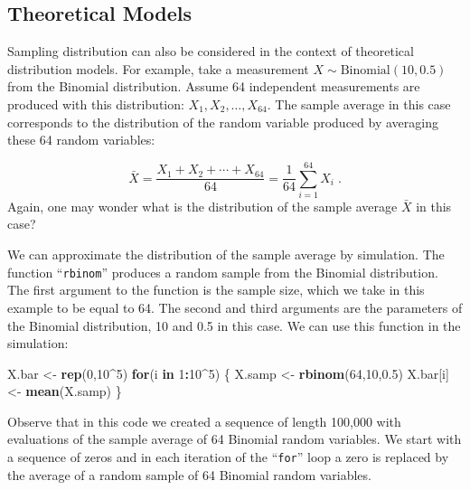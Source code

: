 \documentclass[]{krantz}
\makeatletter
\newenvironment{Shaded}{\begin{snugshade}}{\end{snugshade}}
\newcommand{\ControlFlowTok}[1]{\textcolor[rgb]{0.13,0.29,0.53}{\textbf{#1}}}
\newcommand{\DecValTok}[1]{\textcolor[rgb]{0.00,0.00,0.81}{#1}}
\newcommand{\FloatTok}[1]{\textcolor[rgb]{0.00,0.00,0.81}{#1}}
\newcommand{\KeywordTok}[1]{\textcolor[rgb]{0.13,0.29,0.53}{\textbf{#1}}}
\newcommand{\NormalTok}[1]{#1}
\newcommand{\OperatorTok}[1]{\textcolor[rgb]{0.81,0.36,0.00}{\textbf{#1}}}
\newcommand{\StringTok}[1]{\textcolor[rgb]{0.31,0.60,0.02}{#1}}
\newenvironment{kframe}{%
\medskip{}
\setlength{\fboxsep}{.8em}
 \def\at@end@of@kframe{}%
 \ifinner\ifhmode%
  \def\at@end@of@kframe{\end{minipage}}%
  \begin{minipage}{\columnwidth}%
 \fi\fi%
 \def\FrameCommand##1{\hskip\@totalleftmargin \hskip-\fboxsep
 \colorbox{shadecolor}{##1}\hskip-\fboxsep
     \hskip-\linewidth \hskip-\@totalleftmargin \hskip\columnwidth}%
 \MakeFramed {\advance\hsize-\width
   \@totalleftmargin\z@ \linewidth\hsize
   \@setminipage}}%
 {\par\unskip\endMakeFramed%
 \at@end@of@kframe}
\renewenvironment{Shaded}{\begin{kframe}}{\end{kframe}}
\theoremstyle{definition}
\theoremstyle{definition}
\theoremstyle{definition}
\theoremstyle{remark}
\makeatother
\begin{document}
\hypertarget{subsec:theoreticalmdls}{%
\subsection{Theoretical Models}\label{subsec:theoreticalmdls}}

Sampling distribution can also be considered in the context of
theoretical distribution models. For example, take a measurement
\(X \sim \mathrm{Binomial}(10,0.5)\) from the Binomial distribution.
Assume 64 independent measurements are produced with this distribution:
\(X_1, X_2, \ldots, X_{64}\). The sample average in this case corresponds
to the distribution of the random variable produced by averaging these
64 random variables:

\[\bar X = \frac{X_1 + X_2 + \cdots + X_{64}} {64} = \frac{1}{64}\sum_{i=1}^{64} X_i\;.\]
Again, one may wonder what is the distribution of the sample average
\(\bar X\) in this case?

We can approximate the distribution of the sample average by simulation.
The function ``\texttt{rbinom}'' produces a random sample from the Binomial
distribution. The first argument to the function is the sample size,
which we take in this example to be equal to 64. The second and third
arguments are the parameters of the Binomial distribution, 10 and 0.5 in
this case. We can use this function in the simulation:

\begin{Shaded}
\begin{Highlighting}[]
\NormalTok{X.bar <-}\StringTok{ }\KeywordTok{rep}\NormalTok{(}\DecValTok{0}\NormalTok{,}\DecValTok{10}\OperatorTok{^}\DecValTok{5}\NormalTok{)}
\ControlFlowTok{for}\NormalTok{(i }\ControlFlowTok{in} \DecValTok{1}\OperatorTok{:}\DecValTok{10}\OperatorTok{^}\DecValTok{5}\NormalTok{) \{}
\NormalTok{  X.samp <-}\StringTok{ }\KeywordTok{rbinom}\NormalTok{(}\DecValTok{64}\NormalTok{,}\DecValTok{10}\NormalTok{,}\FloatTok{0.5}\NormalTok{)}
\NormalTok{  X.bar[i] <-}\StringTok{ }\KeywordTok{mean}\NormalTok{(X.samp)}
\NormalTok{\}}
\end{Highlighting}
\end{Shaded}

Observe that in this code we created a sequence of length 100,000 with
evaluations of the sample average of 64 Binomial random variables. We
start with a sequence of zeros and in each iteration of the ``\texttt{for}'' loop
a zero is replaced by the average of a random sample of 64 Binomial
random variables.
\end{document}
